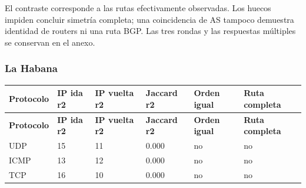\endgroup
El contraste corresponde a las rutas efectivamente observadas. Los huecos impiden concluir simetría completa; una coincidencia de AS tampoco demuestra identidad de routers ni una ruta BGP. Las tres rondas y las respuestas múltiples se conservan en el anexo.

\subsubsection{La Habana}
\begingroup
\fontsize{9}{11}\selectfont
\addtocounter{table}{-1}
\begin{longtable}{p{2.1cm}p{1.7cm}p{2cm}p{2cm}p{2.2cm}p{2.7cm}}
\toprule
\textbf{Protocolo} & \textbf{IP ida r2} & \textbf{IP vuelta r2} & \textbf{Jaccard r2} & \textbf{Orden igual} & \textbf{Ruta completa} \\ \midrule
\endfirsthead
\toprule
\textbf{Protocolo} & \textbf{IP ida r2} & \textbf{IP vuelta r2} & \textbf{Jaccard r2} & \textbf{Orden igual} & \textbf{Ruta completa} \\ \midrule
\endhead
UDP & 15 & 11 & 0.000 & no & no \\
ICMP & 13 & 12 & 0.000 & no & no \\
TCP & 16 & 10 & 0.000 & no & no \\
\bottomrule
\end{longtable}
\endgroup
\begingroup
\fontsize{9}{11}\selectfont
